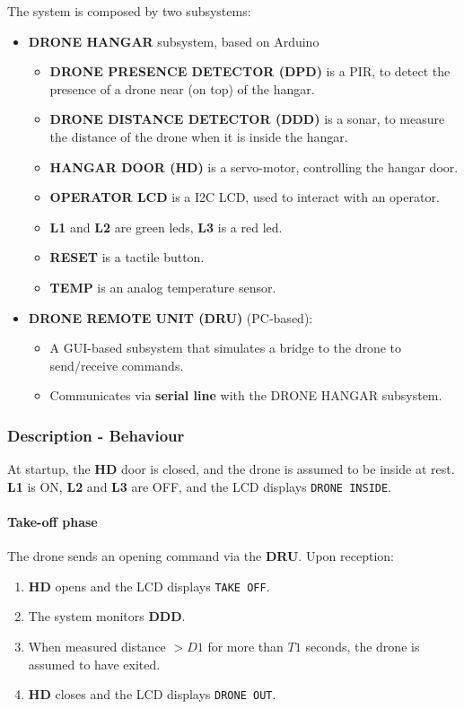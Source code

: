 \documentclass[12pt, letterpaper, twoside]{article}
\begin{document}
The system is composed by two subsystems:

\begin{itemize}
    \item \textbf{DRONE HANGAR} subsystem, based on Arduino 
    \begin{itemize}
        \item \textbf{DRONE PRESENCE DETECTOR (DPD)} is a PIR, to detect the presence of a drone near (on top) of the hangar.
        \item \textbf{DRONE DISTANCE DETECTOR (DDD)} is a sonar, to measure the distance of the drone when it is inside the hangar.
        \item \textbf{HANGAR DOOR (HD)} is a servo-motor, controlling the hangar door.
        \item \textbf{OPERATOR LCD} is a I2C LCD, used to interact with an operator.
        \item \textbf{L1} and \textbf{L2} are green leds, \textbf{L3} is a red led.
        \item \textbf{RESET} is a tactile button.
        \item \textbf{TEMP} is an analog temperature sensor.
    \end{itemize}
    \item \textbf{DRONE REMOTE UNIT (DRU)} (PC-based):
    \begin{itemize}
        \item A GUI-based subsystem that simulates a bridge to the drone to send/receive commands.
        \item Communicates via \textbf{serial line} with the DRONE HANGAR subsystem.
    \end{itemize}
\end{itemize}  

\subsubsection{Description - Behaviour}

At startup, the \textbf{HD} door is closed, and the drone is assumed to be inside at rest. \textbf{L1} is ON, \textbf{L2} and \textbf{L3} are OFF, and the LCD displays \texttt{DRONE INSIDE}.

\paragraph{Take-off phase}
The drone sends an opening command via the \textbf{DRU}. Upon reception:
\begin{enumerate}
    \item \textbf{HD} opens and the LCD displays \texttt{TAKE OFF}.
    \item The system monitors \textbf{DDD}.
    \item When measured distance $> D1$ for more than $T1$ seconds, the drone is assumed to have exited.
    \item \textbf{HD} closes and the LCD displays \texttt{DRONE OUT}.
\end{enumerate}
\end{document}

